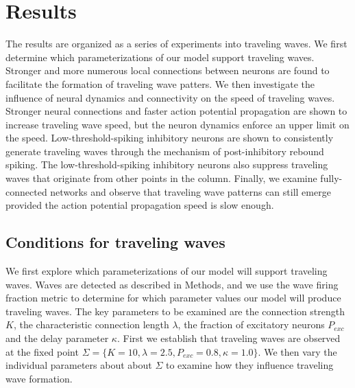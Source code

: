 \documentclass[a4paper,11pt]{article}
\begin{document}
\FloatBarrier

\section{Results}
The results are organized as a series of experiments into traveling waves.
We first determine which parameterizations of our model support traveling waves.
Stronger and more numerous local connections between neurons are found to facilitate the formation of traveling wave patters.
We then investigate the influence of neural dynamics and connectivity on the speed of traveling waves.
Stronger neural connections and faster action potential propagation are shown to increase traveling wave speed, but the neuron dynamics enforce an upper limit on the speed. 
Low-threshold-spiking inhibitory neurons are shown to consistently generate traveling waves through the mechanism of post-inhibitory rebound spiking.
The low-threshold-spiking inhibitory neurons also suppress traveling waves that originate from other points in the column.
Finally, we examine fully-connected networks and observe that traveling wave patterns can still emerge provided the action potential propagation speed is slow enough.

\subsection{Conditions for traveling waves} \label{sub:waves}
We first explore which parameterizations of our model will support traveling waves.
Waves are detected as described in Methods, and we use the wave firing fraction metric to determine for which parameter values our model will produce traveling waves.
The key parameters to be examined are the connection strength $K$, the characteristic connection length $\lambda$, the fraction of excitatory neurons $P_{exc}$ and the delay parameter $\kappa$.
First we establish that traveling waves are observed at the fixed point $\Sigma = \{K=10,\lambda=2.5,P_{exc}=0.8,\kappa=1.0 \}$.
We then vary the individual parameters about about $\Sigma$ to examine how they influence traveling wave formation.
\end{document}
